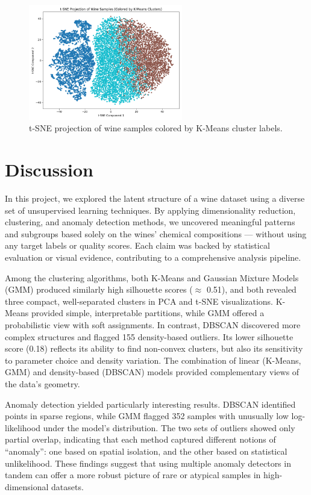 \documentclass[12pt]{article}
\begin{document}
\begin{figure}[H]
    \centering
    \includegraphics[width=0.6\textwidth]{figures/tsne_kmeans.png}
    \caption{t-SNE projection of wine samples colored by K-Means cluster labels.}
    \label{L}
\end{figure}



\section{Discussion}

In this project, we explored the latent structure of a wine dataset using a diverse set of unsupervised learning techniques. By applying dimensionality reduction, clustering, and anomaly detection methods, we uncovered meaningful patterns and subgroups based solely on the wines' chemical compositions — without using any target labels or quality scores. Each claim was backed by statistical evaluation or visual evidence, contributing to a comprehensive analysis pipeline.

Among the clustering algorithms, both K-Means and Gaussian Mixture Models (GMM) produced similarly high silhouette scores ($\approx$ 0.51), and both revealed three compact, well-separated clusters in PCA and t-SNE visualizations. K-Means provided simple, interpretable partitions, while GMM offered a probabilistic view with soft assignments. In contrast, DBSCAN discovered more complex structures and flagged 155 density-based outliers. Its lower silhouette score (0.18) reflects its ability to find non-convex clusters, but also its sensitivity to parameter choice and density variation. The combination of linear (K-Means, GMM) and density-based (DBSCAN) models provided complementary views of the data's geometry.

Anomaly detection yielded particularly interesting results. DBSCAN identified points in sparse regions, while GMM flagged 352 samples with unusually low log-likelihood under the model’s distribution. The two sets of outliers showed only partial overlap, indicating that each method captured different notions of “anomaly”: one based on spatial isolation, and the other based on statistical unlikelihood. These findings suggest that using multiple anomaly detectors in tandem can offer a more robust picture of rare or atypical samples in high-dimensional datasets.
\end{document}
